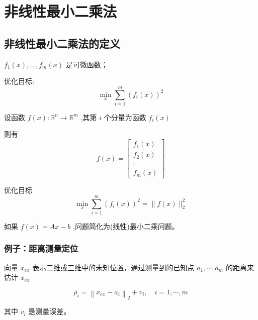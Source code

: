 \chapter{非线性最小二乘法}

\section{非线性最小二乘法的定义}

\begin{problem}
    $ f_{1}(x), \ldots, f_{m}(x) $ 是可微函数；

    优化目标: \begin{equation} \min _{x} \sum_{i=1}^{m}\left(f_{i}(x)\right)^{2} \end{equation}

\end{problem}

\begin{problem}
    \label{pbl:non-linear-least-squares}
    设函数 $ f(x): \mathbb{R}^{n} \rightarrow \mathbb{R}^{m} $ ,其第 $ i $ 个分量为函数 $ f_{i}(x)$

    则有
    \begin{equation}
    f(x)=\left[\begin{array}{c}
    f_{1}(x) \\
    f_{2}(x) \\
    \vdots \\
    f_{m}(x)
    \end{array}\right]
    \end{equation}

    优化目标
    \begin{equation} \min _{x} \sum_{i=1}^{m}\left(f_{i}(x)\right)^{2}=\|f(x)\|_{2}^{2} \end{equation}
\end{problem}


如果 $ f(x)=A x-b $ ,问题简化为(线性)最小二乘问题。

\subsection{例子：距离测量定位}

\begin{problem}
    向量 $ x_{e x} $ 表示二维或三维中的未知位置，通过测量到的已知点 $ a_{1}, \cdots, a_{m} $ 的距离来估计 $ x_{e x} $ 

    \begin{equation}
    \rho_{i}=\left\|x_{e x}-a_{i}\right\|_{2}+v_{i}, \quad i=1, \cdots, m
    \end{equation}

    其中 $ v_{i} $ 是测量误差。
\end{problem}

